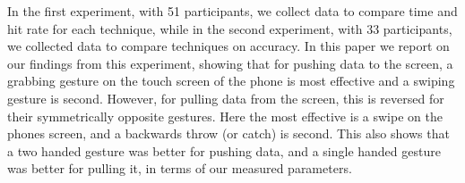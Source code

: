 In the first experiment, with 51 participants, we collect data to compare time and hit rate for each technique, while in the second experiment, with 33 participants, we collected data to compare techniques on accuracy.
In this paper we report on our findings from this experiment, showing that for pushing data to the screen, a grabbing gesture on the touch screen of the phone is most effective and a swiping gesture is second.
However, for pulling data from the screen, this is reversed for their symmetrically opposite gestures.
Here the most effective is a swipe on the phones screen, and a backwards throw (or catch) is second.
This also shows that a two handed gesture was better for pushing data, and a single handed gesture was better for pulling it, in terms of our measured parameters.